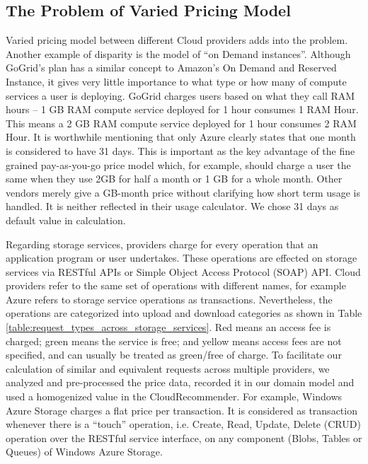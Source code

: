 \subsection{The Problem of Varied Pricing Model}
Varied pricing model between different Cloud providers adds into the problem.
Another example of disparity is the model of “on Demand instances”. Although GoGrid’s plan has a similar concept to Amazon’s On Demand and Reserved Instance, it gives very little importance to what type or how many of compute services a user is deploying. GoGrid charges users based on what they
call RAM hours – 1 GB RAM compute service deployed for 1 hour consumes 1 RAM Hour. This means a 2 GB RAM compute service deployed for 1 hour consumes 2 RAM Hour.
It is worthwhile mentioning that only Azure clearly states that one month is considered to have 31 days. This is important as the key advantage of the fine grained pay-as-you-go price model which, for example, should charge a user the same when they use 2GB for
half a month or 1 GB for a whole month. 
Other vendors merely give a GB-month price
without clarifying how short term usage is handled. It is neither reflected in their usage
calculator. We chose 31 days as default value in calculation.

Regarding storage services, providers charge for every operation that an application
program or user undertakes. These operations are effected on storage services via
RESTful APIs or Simple Object Access Protocol (SOAP) API. Cloud providers refer to
the same set of operations with different names, for example Azure refers to storage
service operations as transactions. Nevertheless, the operations are categorized into
upload and download categories as shown in Table \ref{table:request_types_across_storage_services}.
Red means an access fee is charged;
green means the service is free; and yellow means access fees are not specified,
and can usually be treated as green/free of charge. To facilitate our calculation of similar
and equivalent requests across multiple providers, we analyzed and pre-processed the
price data, recorded it in our domain model and used a homogenized value in the CloudRecommender. For example, Windows Azure Storage
charges a flat price per transaction. It is considered as transaction whenever there is a
“touch” operation, i.e. Create, Read, Update, Delete (CRUD) operation over the RESTful
service interface, on any component (Blobs, Tables or Queues) of Windows Azure Storage.

